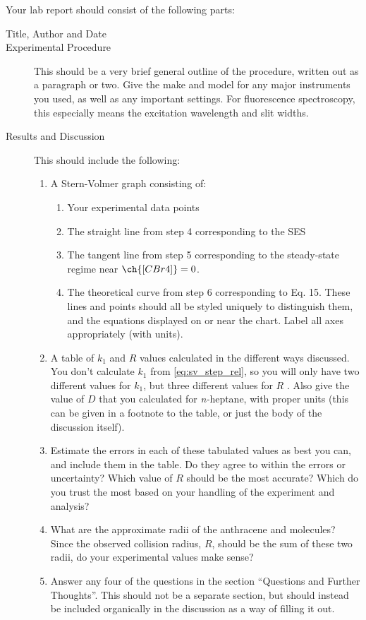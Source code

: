Your lab report should consist of the following parts:
\begin{description}
	\item[Title, Author and Date]
	\item[Experimental Procedure] This should be a very brief general outline of the procedure, written out as a paragraph or two. Give the make and model for any major instruments you used, as well as any important settings. For fluorescence spectroscopy, this especially means the excitation wavelength and slit widths.
	\item[Results and Discussion] This should include the following:
	\begin{enumerate}
		\item A Stern-Volmer graph consisting of:
		\begin{enumerate}
			\item Your experimental data points
			\item The straight line from step 4 corresponding to the SES
			\item The tangent line from step 5 corresponding to the steady-state regime near \( \ch{[CBr4]} = 0 \).
			\item The theoretical curve from step 6 corresponding to Eq. 15. 
			These lines and points should all be styled uniquely to distinguish them, and the equations displayed on or near the chart. 
			Label all axes appropriately (with units).
		\end{enumerate}
		\item A table of \( k_1 \) and \( R \) values calculated in the different ways discussed. 
		You don’t calculate \( k_1 \) from \cref{eq:sv_step_rel}, so you will only have two different values for \( k_1 \), but three different values for \( R \) . 
		Also give the value of \( D \) that you calculated for \emph{n-}heptane, with proper units (this can be given in a footnote to the table, or just the body of the discussion itself).
		\item Estimate the errors in each of these tabulated values as best you can, and include them in the table. 
		Do they agree to within the errors or uncertainty? 
		Which value of \( R \) should be the most accurate? 
		Which do you trust the most based on your handling of the experiment and analysis?
		\item What are the approximate radii of the anthracene and  molecules? 
		Since the observed collision radius, \( R \), should be the sum of these two radii, do your experimental values make sense?
		\item Answer any four of the questions in the section ``Questions and Further Thoughts''. This should not be a separate section, but should instead be included organically in the discussion as a way of filling it out.
\end{enumerate}
\end{description}
